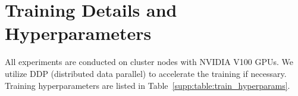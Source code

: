 \section{Training Details and Hyperparameters}
\label{supp:sec:hyperparameters}

All experiments are conducted on cluster nodes with NVIDIA V100 GPUs.
We utilize DDP (distributed data parallel) to accelerate the training if necessary.
Training hyperparameters are listed in Table~\ref{supp:table:train_hyperparams}.

